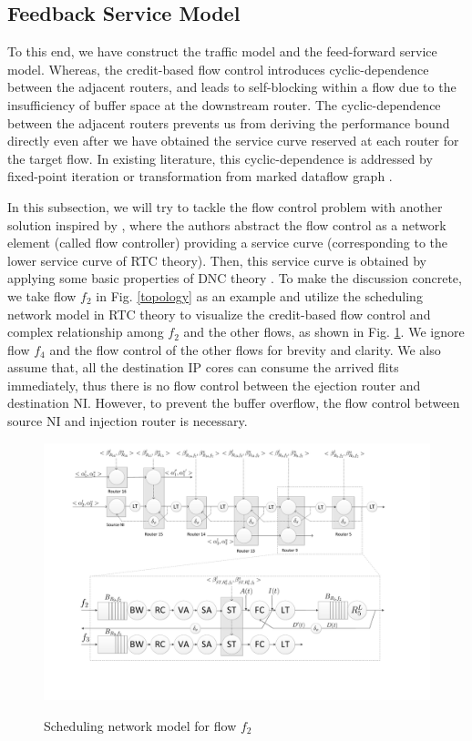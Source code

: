 \documentclass[preprint]{elsarticle}
\begin{document}
\subsection{Feedback Service Model}\label{flowcontrol}
To this end, we have construct the traffic model and the feed-forward service model. Whereas, the credit-based flow control introduces cyclic-dependence between the adjacent routers, and leads to self-blocking within a flow due to the insufficiency of buffer space at the downstream router. The cyclic-dependence between the adjacent routers prevents us from deriving the performance bound directly even after we have obtained the service curve reserved at each router for the target flow. In existing literature, this cyclic-dependence is addressed by fixed-point iteration \cite{schioler2005network} or transformation from marked dataflow graph \cite{Thiele:2009:MPA:1629335.1629353}.

In this subsection, we will try to tackle the flow control problem with another solution inspired by \cite{qian2009analysis}, where the authors abstract the flow control as a network element (called flow controller) providing a service curve (corresponding to the lower service curve of RTC theory). Then, this service curve is obtained by applying some basic properties of DNC theory \cite{Boudec2001Network}. To make the discussion concrete, we take flow $f_2$ in Fig. \ref{topology} as an example and utilize the scheduling network model \cite{1253607} in RTC theory to visualize the credit-based flow control and complex relationship among $f_2$ and the other flows, as shown in Fig. \ref{f2}. We ignore flow $f_4$ and the flow control of the other flows for brevity and clarity. We also assume that, all the destination IP cores can consume the arrived flits immediately, thus there is no flow control between the ejection router and destination NI. However, to prevent the buffer overflow, the flow control between source NI and injection router is necessary.
\begin{figure}
  \centering
  \includegraphics[scale=0.35]{figures/f2.pdf}\\
  \caption{Scheduling network model for flow $f_2$}\label{f2}
\end{figure}
\end{document}
